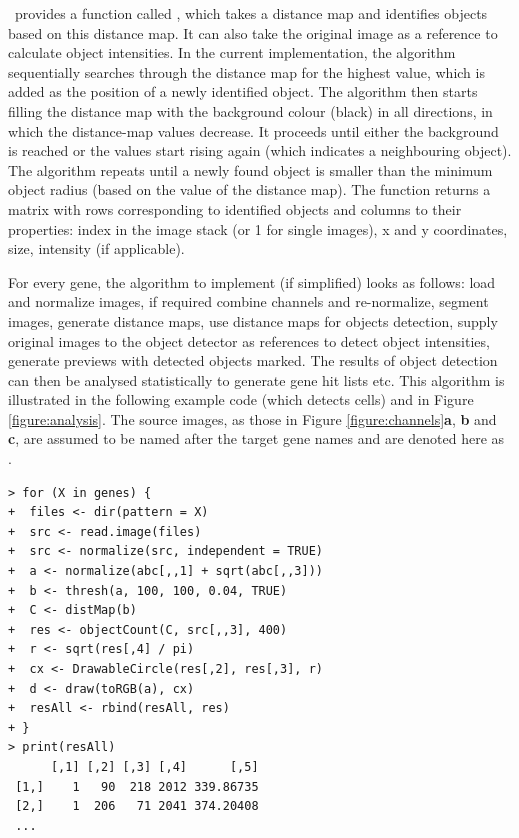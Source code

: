 \EBImage\ provides a function called , which takes a distance map and identifies objects based on this distance map. It can also take the original image as a reference to calculate object intensities. In the current implementation, the algorithm sequentially searches through the distance map for the highest value, which is added as the position of a newly identified object. The algorithm then starts filling the distance map with the background colour (black) in all directions, in which the distance-map values decrease. It proceeds until either the background is reached or the values start rising again (which indicates a neighbouring object). The algorithm repeats until a newly found object is smaller than the minimum object radius (based on the value of the distance map). The function returns a matrix with rows corresponding to identified objects and columns to their properties: index in the image stack (or 1 for single images), x and y coordinates, size, intensity (if applicable).

For every gene, the algorithm to implement (if simplified) looks as follows: load and normalize images, if required combine channels and re-normalize, segment images, generate distance maps, use distance maps for objects detection, supply original images to the object detector as references to detect object intensities, generate previews with detected objects marked. The results of object detection can then be analysed statistically to generate gene hit lists etc. This algorithm is illustrated in the following example code (which detects cells) and in Figure \ref{figure:analysis}. The source images, as those in Figure \ref{figure:channels}{\bf a}, {\bf b} and {\bf c}, are assumed to be named after the target gene names and are denoted here as .

\begin{verbatim}
> for (X in genes) {
+  files <- dir(pattern = X)
+  src <- read.image(files)
+  src <- normalize(src, independent = TRUE)
+  a <- normalize(abc[,,1] + sqrt(abc[,,3]))
+  b <- thresh(a, 100, 100, 0.04, TRUE)
+  C <- distMap(b)
+  res <- objectCount(C, src[,,3], 400)
+  r <- sqrt(res[,4] / pi)
+  cx <- DrawableCircle(res[,2], res[,3], r)
+  d <- draw(toRGB(a), cx)
+  resAll <- rbind(resAll, res)
+ }
> print(resAll)
      [,1] [,2] [,3] [,4]      [,5]
 [1,]    1   90  218 2012 339.86735
 [2,]    1  206   71 2041 374.20408
 ...
\end{verbatim}

